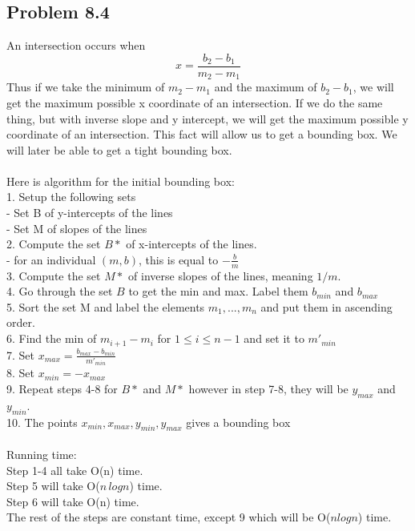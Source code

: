 \documentclass[11pt,psfig]{article}
\begin{document}
\newpage

\subsection*{Problem 8.4}

An intersection occurs when 
\[
x = \frac{b_2-b_1}{m_2-m_1}
\]
Thus if we take the minimum of $m_2-m_1$ and the maximum of $b_2-b_1$, we will get the maximum possible x coordinate of an intersection. If we do the same thing, but with inverse slope and y intercept, we will get the maximum possible y coordinate of an intersection. This fact will allow us to get a bounding box. We will later be able to get a tight bounding box.\\
\\
Here is algorithm for the initial bounding box:\\
1. Setup the following sets\\
		- Set B of y-intercepts of the lines\\
		- Set M of slopes of the lines\\
2. Compute the set $B*$ of x-intercepts of the lines. \\
			- for an individual $(m,b)$, this is equal to $-\frac{b}{m}$\\
3. Compute the set $M*$ of inverse slopes of the lines, meaning $1/m$. \\
4. Go through the set $B$ to get the min and max. Label them $b_{min}$ and $b_{max}$\\
5. Sort the set M and label the elements $m_1,...,m_n$ and put them in ascending order. \\
6. Find the min of $m_{i+1} - m_i$ for $1 \leq i \leq n-1$ and set it to $m'_{min}$ \\
7. Set $x_{max} = \frac{b_{max}-b_{min}}{m'_{min}}$\\
8. Set $x_{min} = -x_{max}$\\
9. Repeat steps 4-8 for $B*$ and $M*$ however in step 7-8, they will be $y_{max}$ and $y_{min}$. \\
10. The points $x_{min},x_{max},y_{min},y_{max}$ gives a bounding box\\
\\
Running time:\\
Step 1-4 all take O(n) time.\\
Step 5 will take O($n \, log n$) time. \\
Step 6 will take O(n) time. \\
The rest of the steps are constant time, except 9 which will be O($n log n$) time. \\
\end{document}
